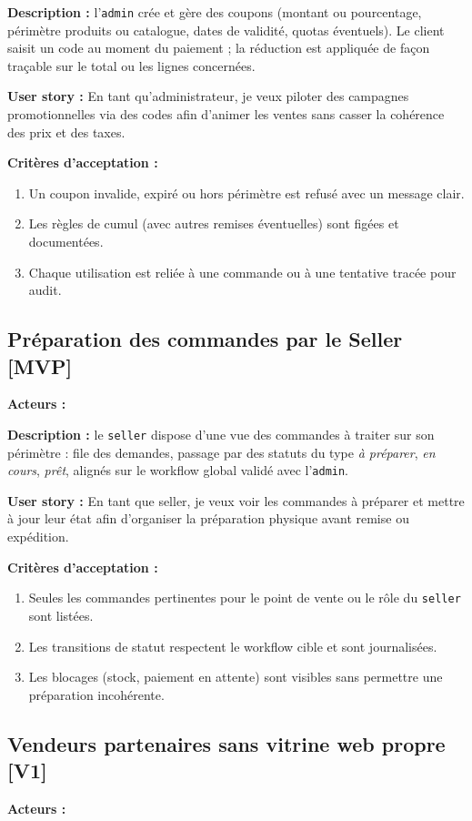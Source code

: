 \documentclass[11pt,a4paper]{scrreprt}
\newcommand{\code}[1]{\texttt{#1}}
\newcommand{\phase}[1]{\textbf{\textcolor{SplinAmber}{#1}}}
\newcommand{\actorbadge}[1]{\highlight{\code{#1}}}
\begin{document}
\textbf{Description :} l'\code{admin} crée et gère des coupons (montant ou pourcentage, périmètre produits ou catalogue, dates de validité, quotas éventuels). Le client saisit un code au moment du paiement ; la réduction est appliquée de façon traçable sur le total ou les lignes concernées.

\textbf{User story :} En tant qu'administrateur, je veux piloter des campagnes promotionnelles via des codes afin d'animer les ventes sans casser la cohérence des prix et des taxes.

\textbf{Critères d'acceptation :}
\begin{enumerate}
  \item Un coupon invalide, expiré ou hors périmètre est refusé avec un message clair.
  \item Les règles de cumul (avec autres remises éventuelles) sont figées et documentées.
  \item Chaque utilisation est reliée à une commande ou à une tentative tracée pour audit.
\end{enumerate}

\subsection{Préparation des commandes par le Seller \phase{[MVP]}}
\textbf{Acteurs :} \actorbadge{SELLER}

\textbf{Description :} le \code{seller} dispose d'une vue des commandes à traiter sur son périmètre : file des demandes, passage par des statuts du type \emph{à préparer}, \emph{en cours}, \emph{prêt}, alignés sur le workflow global validé avec l'\code{admin}.

\textbf{User story :} En tant que seller, je veux voir les commandes à préparer et mettre à jour leur état afin d'organiser la préparation physique avant remise ou expédition.

\textbf{Critères d'acceptation :}
\begin{enumerate}
  \item Seules les commandes pertinentes pour le point de vente ou le rôle du \code{seller} sont listées.
  \item Les transitions de statut respectent le workflow cible et sont journalisées.
  \item Les blocages (stock, paiement en attente) sont visibles sans permettre une préparation incohérente.
\end{enumerate}

\subsection{Vendeurs partenaires sans vitrine web propre \phase{[V1]}}
\textbf{Acteurs :} \actorbadge{ADMIN} \actorbadge{SELLER}
\end{document}
